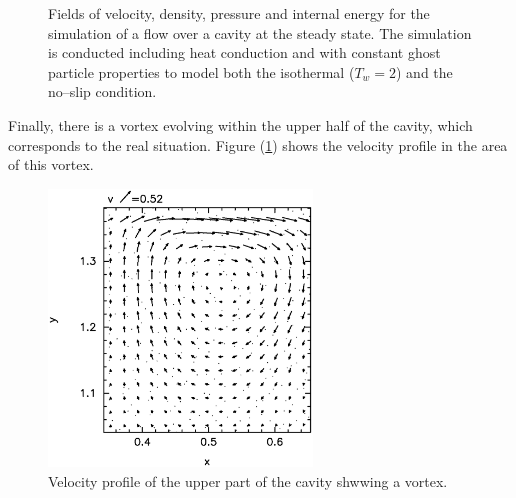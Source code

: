 \documentclass[11pt,a4paper,twoside]{report}
\begin{document}
\begin{figure}[!htbp]
{}

\caption[Property fields for Cavity]{Fields of velocity, density, pressure and internal energy for the simulation of a flow over a cavity at the steady state. The simulation is conducted including heat conduction and with constant ghost particle properties to model both the isothermal ($T_w=2$) and the no--slip condition.}

\end{figure}


Finally, there is a vortex evolving within the upper half of the cavity, which corresponds to the real situation. Figure (\ref{fig:Cavity_vortex}) shows the velocity profile in the area of this vortex.


\begin{figure}
 \centering
\label{fig:Cavity_vortex}
\includegraphics[width=7cm]{Graphics/results/Porosities/Cavity/supLen_dx_4_dx0_2_SumDens_g0_2/vortex25}
\caption[Vortex in Cavity]{Velocity profile of the upper part of the cavity shwwing a vortex.}
\end{figure}
\end{document}
